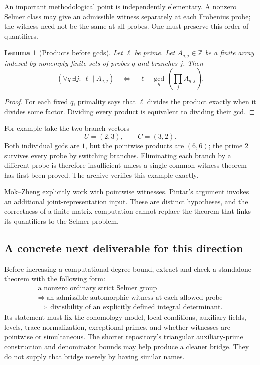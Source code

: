 \documentclass[11pt,letterpaper]{article}
\newtheorem{lemma}[theorem]{Lemma}
\theoremstyle{definition}
\theoremstyle{remark}
\newcommand{\Z}{\mathbb Z}
\begin{document}
An important methodological point is independently elementary.
A nonzero Selmer class may give an admissible witness separately
at each Frobenius probe; the witness need not be the same at all
probes. One must preserve this order of quantifiers.

\begin{lemma}[Products before gcds]\label{lem:gcd}
Let \(\ell\) be prime. Let \(A_{q,j}\in\Z\) be a finite array
indexed by nonempty finite sets of probes \(q\) and branches \(j\).
Then
\[
 (\forall q\ \exists j:\ \ell\mid A_{q,j})
 \quad\Longleftrightarrow\quad
 \ell\mid\gcd_q\left(\prod_j A_{q,j}\right).
\]
\end{lemma}
\begin{proof}
For each fixed \(q\), primality says that \(\ell\) divides the
product exactly when it divides some factor. Dividing every
product is equivalent to dividing their gcd.
\end{proof}

For example take the two branch vectors
\[
 U=(2,3),\qquad C=(3,2).
\]
Both individual gcds are \(1\), but the pointwise products are
\((6,6)\); the prime \(2\) survives every probe by switching
branches. Eliminating each branch by a different probe is
therefore insufficient unless a single common-witness theorem
has first been proved. The archive verifies this example exactly.

Mok--Zheng explicitly work with pointwise witnesses. Pintar's
argument invokes an additional joint-representation input.
These are distinct hypotheses, and the correctness of a finite
matrix computation cannot replace the theorem that links its
quantifiers to the Selmer problem.

\subsection{A concrete next deliverable for this direction}

Before increasing a computational degree bound, extract and check
a standalone theorem with the following form:
\[
 \begin{gathered}
 \text{a nonzero ordinary strict Selmer group}\\
 \Longrightarrow\
 \text{an admissible automorphic witness at each allowed probe}\\
 \Longrightarrow\
 \text{divisibility of an explicitly defined integral determinant}.
 \end{gathered}
\]
Its statement must fix the cohomology model, local conditions,
auxiliary fields, levels, trace normalization, exceptional primes,
and whether witnesses are pointwise or simultaneous.
The shorter repository's triangular auxiliary-prime construction
and denominator bounds may help produce a cleaner bridge.
They do not supply that bridge merely by having similar names.
\end{document}
